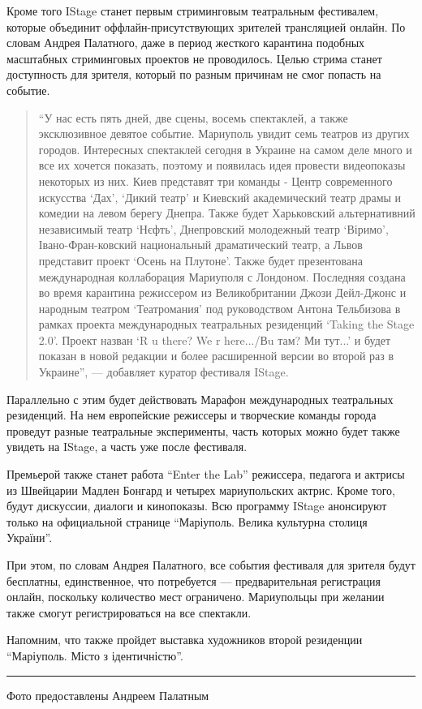 Кроме того IStage станет первым стриминговым театральным фестивалем, которые
объединит оффлайн-присутствующих зрителей трансляцией онлайн. По словам Андрея
Палатного, даже в период жесткого карантина подобных масштабных стриминговых
проектов не проводилось. Целью стрима станет доступность для зрителя, который
по разным причинам не смог попасть на событие.

\begin{quote}
\enquote{У нас есть пять дней, две сцены, восемь спектаклей, а также эксклюзивное
девятое событие. Мариуполь увидит семь театров из других городов. Интересных
спектаклей сегодня в Украине на самом деле много и все их хочется показать,
поэтому и появилась идея провести видеопоказы некоторых из них. Киев
представят три команды - Центр современного искусства \enquote{Дах}, \enquote{Дикий театр} и
Киевский академический театр драмы и комедии на левом берегу Днепра. Также
будет Харьковский альтернативний независимый театр \enquote{Нєфть}, Днепровский
молодежный театр \enquote{Віримо}, Івано-Фран\hyp{}ковский национальный драматический
театр, а Львов представит проект \enquote{Осень на Плутоне}. Также будет презентована
международная коллаборация Мариуполя с Лондоном. Последняя создана во время
карантина режиссером из Великобритании Джози Дейл-Джонс и народным театром
\enquote{Театромания} под руководством Антона Тельбизова в рамках проекта
международных театральных резиденций \enquote{Taking the Stage 2.0}. Проект назван \enquote{R
u there? We r here.../Вu там? Ми тут...} и будет показан в новой редакции и
более расширенной версии во второй раз в Украине}, — добавляет куратор
фестиваля IStage.
\end{quote}

Параллельно с этим будет действовать Марафон международных театральных
резиденций. На нем европейские режиссеры и творческие команды города проведут
разные театральные эксперименты, часть которых можно будет также увидеть на
IStage, а часть уже после фестиваля.

Премьерой также станет работа \enquote{Enter the Lab} режиссера, педагога и актрисы из
Швейцарии Мадлен Бонгард и четырех мариупольских актрис. Кроме того, будут
дискуссии, диалоги и кинопоказы. Всю программу IStage анонсируют только на
официальной странице \enquote{Маріуполь. Велика культурна столиця України}.

При этом, по словам Андрея Палатного, все события фестиваля для зрителя будут
бесплатны, единственное, что потребуется — предварительная регистрация онлайн,
поскольку количество мест ограничено. Мариупольцы при желании также смогут
регистрироваться на все спектакли.

Напомним, что также пройдет выставка художников второй резиденции \enquote{Маріуполь.
Місто з ідентичністю}.

\par\noindent\rule{\textwidth}{0.4pt}

Фото предоставлены Андреем Палатным
